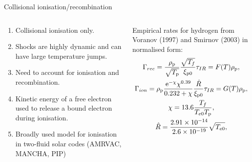 \documentclass[10pt,aspectratio=169,usenames,dvipsnames]{beamer}
\begin{document}
\begin{frame}{Collisional ionisation/recombination}
\begin{columns}
\begin{column}{0.4\textwidth}
\begin{enumerate}
\item Collisional ionisation only.
\item Shocks are highly dynamic and can have large temperature jumps.
\item Need to account for ionisation and recombination.
\item Kinetic energy of a free electron used to release a bound electron during ionisation.
\item Broadly used model for ionisation in two-fluid solar codes (AMRVAC, MANCHA, PIP)
\end{enumerate}
\end{column}
\begin{column}{0.6\textwidth}
Empirical rates for hydrogen from Voranov (1997) and Smirnov (2003) in normalised form:
    \begin{gather}
    \Gamma_{rec} = \frac{\rho_{\rm p}}{\sqrt{T_{\rm p}}} \frac{\sqrt{T_f}}{\xi _{{\rm p}0}} \tau _{IR} = F(T) \rho_{\rm p}, \\
    \Gamma_{ion} = \rho_{\rm p} \frac{\mbox{e} ^{-\chi} \chi ^{0.39} }{0.232 + \chi} \frac{\hat{R}}{\xi _{{\rm p}0}} \tau _{IR} = G(T) \rho_{\rm p}, \\
    \chi = 13.6 \frac{T_f}{T_{e0} T_{\rm p}}, \\
    \hat{R} = \frac{2.91 \times 10 ^{-14}}{2.6 \times 10^{-19}} \sqrt{T_{e0}},
\end{gather}
\end{column}
\end{columns}
\end{frame}
\end{document}
